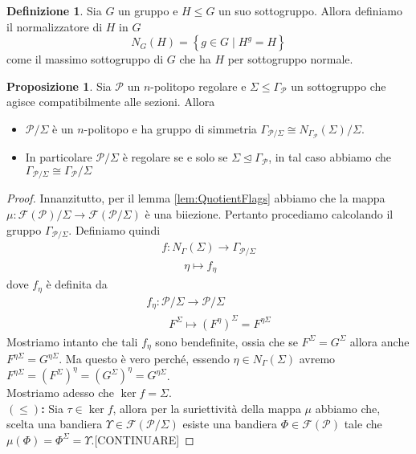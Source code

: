 \documentclass[a4paper,12pt]{report}
\newcommand{\p}{\mathcal{P}}
\theoremstyle{plain}
\theoremstyle{definition}
\newtheorem{defin}[teo]{Definizione}
\newtheorem{prop}[teo]{Proposizione}
\newcommand\point[1]{$\bm{(#1)}$\textbf{: }}
\newcommand\flag[1]{\mathcal{F}(#1)}
\begin{document}
\begin{defin}
Sia $G$ un gruppo e $H\leq G$ un suo sottogruppo. Allora definiamo il normalizzatore di $H$ in $G$
\begin{equation*}
N_G(H)=\left\{g\in G\mid H^g=H\right\}
\end{equation*}
come il massimo sottogruppo di $G$ che ha $H$ per sottogruppo normale.
\end{defin}
\begin{prop}
\label{prop:RegularQuotientGroup}
Sia $\p$ un $n$-politopo regolare e $\Sigma\leq\Gamma_\p$ un sottogruppo che agisce compatibilmente alle sezioni. Allora
\begin{itemize}
\item$\p/\Sigma$ \`e un $n$-politopo e ha gruppo di simmetria $\Gamma_{\p/\Sigma}\cong N_{\Gamma_\p}(\Sigma)/\Sigma$.\\
\item In particolare $\p/\Sigma$ \`e regolare se e solo se $\Sigma\unlhd\Gamma_\p$, in tal caso abbiamo che $\Gamma_{\p/\Sigma}\cong\Gamma_\p/\Sigma$
\end{itemize}
\end{prop}
\begin{proof}
Innanzitutto, per il lemma \ref{lem:QuotientFlags} abbiamo che la mappa $\mu:\flag{\p}/\Sigma\longrightarrow\flag{\p/\Sigma}$ \`e una biiezione. Pertanto
procediamo calcolando il gruppo $\Gamma_{\p/\Sigma}$. Definiamo quindi
\begin{gather*}
f:N_\Gamma(\Sigma)\longrightarrow\Gamma_{\p/\Sigma}\\
\qquad\eta\mapsto f_\eta
\end{gather*}
dove $f_\eta$ \`e definita da
\begin{gather*}
f_\eta:\p/\Sigma\longrightarrow\p/\Sigma\\
\qquad F^\Sigma\mapsto (F^{\eta})^\Sigma=F^{\eta\Sigma}
\end{gather*}
Mostriamo intanto che tali $f_\eta$ sono bendefinite, ossia che se $F^\Sigma=G^\Sigma$ allora anche $F^{\eta\Sigma}=G^{\eta\Sigma}$. Ma questo \`e vero
perch\'e, essendo $\eta\in N_\Gamma(\Sigma)$ avremo $F^{\eta\Sigma}=(F^\Sigma)^\eta=(G^\Sigma)^\eta=G^{\eta\Sigma}$.\\
Mostriamo adesso che $\ker{f}=\Sigma$.\\
\point{\leq}Sia $\tau\in\ker{f}$, allora per la suriettivit\`a della mappa $\mu$ abbiamo che, scelta una bandiera
$\Upsilon\in\flag{\p/\Sigma}$ esiste una bandiera $\Phi\in\flag{\p}$ tale che $\mu(\Phi)=\Phi^{\Sigma}=\Upsilon$.[CONTINUARE]
\end{proof}
\end{document}
